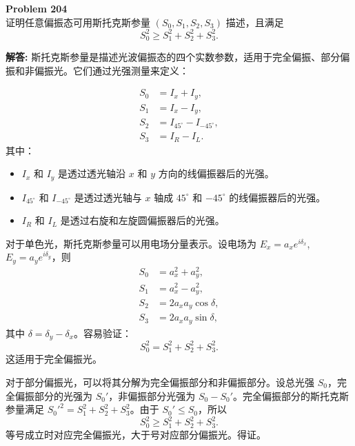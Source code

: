 \documentclass[12pt, a4paper, oneside]{ctexart}
\newenvironment{solution}{\par\noindent\textbf{解答:}\quad}{\par}
\begin{document}
\begin{mdframed}[backgroundcolor=gray!10, linewidth=0pt]
    \textbf{Problem 204} \\
    证明任意偏振态可用斯托克斯参量 $(S_0, S_1, S_2, S_3)$ 描述，且满足
    \[
    S_0^2 \ge S_1^2 + S_2^2 + S_3^2.
    \]
\end{mdframed}
\begin{solution}
    斯托克斯参量是描述光波偏振态的四个实数参数，适用于完全偏振、部分偏振和非偏振光。它们通过光强测量来定义：

    \begin{align*}
        S_0 &= I_x + I_y, \\
        S_1 &= I_x - I_y, \\
        S_2 &= I_{45^\circ} - I_{-45^\circ}, \\
        S_3 &= I_R - I_L.
    \end{align*}
    其中：
    \begin{itemize}
        \item $I_x$ 和 $I_y$ 是透过透光轴沿 $x$ 和 $y$ 方向的线偏振器后的光强。
        \item $I_{45^\circ}$ 和 $I_{-45^\circ}$ 是透过透光轴与 $x$ 轴成 $45^\circ$ 和 $-45^\circ$ 的线偏振器后的光强。
        \item $I_R$ 和 $I_L$ 是透过右旋和左旋圆偏振器后的光强。
    \end{itemize}
    对于单色光，斯托克斯参量可以用电场分量表示。设电场为 $E_x = a_x e^{i\delta_x}$, $E_y = a_y e^{i\delta_y}$，则
    \begin{align*}
        S_0 &= a_x^2 + a_y^2, \\
        S_1 &= a_x^2 - a_y^2, \\
        S_2 &= 2 a_x a_y \cos\delta, \\
        S_3 &= 2 a_x a_y \sin\delta,
    \end{align*}
    其中 $\delta = \delta_y - \delta_x$。容易验证：
    \[
    S_0^2 = S_1^2 + S_2^2 + S_3^2.
    \]
    这适用于完全偏振光。

    对于部分偏振光，可以将其分解为完全偏振部分和非偏振部分。设总光强 $S_0$，完全偏振部分的光强为 $S_0'$，非偏振部分光强为 $S_0 - S_0'$。完全偏振部分的斯托克斯参量满足 $S_0'^2 = S_1^2 + S_2^2 + S_3^2$。由于 $S_0' \le S_0$，所以
    \[
    S_0^2 \ge S_1^2 + S_2^2 + S_3^2.
    \]
    等号成立时对应完全偏振光，大于号对应部分偏振光。得证。
\end{solution}
\end{document}

